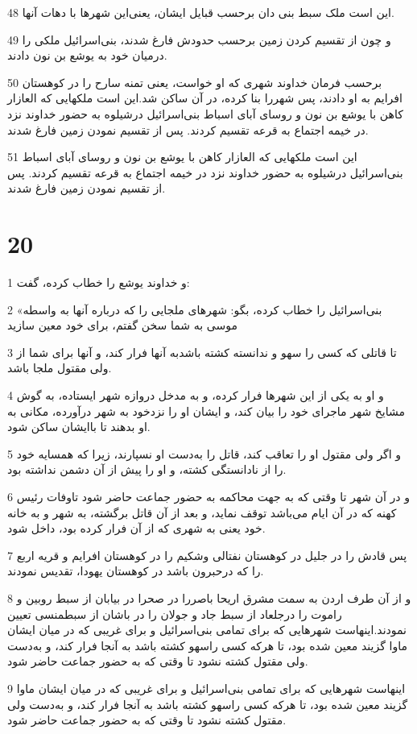 \par 48 این است ملک سبط بنی دان برحسب قبایل ایشان، یعنی‌این شهرها با دهات آنها.
\par 49 و چون از تقسیم کردن زمین برحسب حدودش فارغ شدند، بنی‌اسرائیل ملکی را درمیان خود به یوشع بن نون دادند.
\par 50 برحسب فرمان خداوند شهری که او خواست، یعنی تمنه سارح را در کوهستان افرایم به او دادند، پس شهررا بنا کرده، در آن ساکن شد.این است ملکهایی که العازار کاهن با یوشع بن نون و روسای آبای اسباط بنی‌اسرائیل درشیلوه به حضور خداوند نزد در خیمه اجتماع به قرعه تقسیم کردند. پس از تقسیم نمودن زمین فارغ شدند.
\par 51 این است ملکهایی که العازار کاهن با یوشع بن نون و روسای آبای اسباط بنی‌اسرائیل درشیلوه به حضور خداوند نزد در خیمه اجتماع به قرعه تقسیم کردند. پس از تقسیم نمودن زمین فارغ شدند.
 
\chapter{20}

\par 1 و خداوند یوشع را خطاب کرده، گفت:
\par 2 «بنی‌اسرائیل را خطاب کرده، بگو: شهرهای ملجایی را که درباره آنها به واسطه موسی به شما سخن گفتم، برای خود معین سازید
\par 3 تا قاتلی که کسی را سهو و ندانسته کشته باشدبه آنها فرار کند، و آنها برای شما از ولی مقتول ملجا باشد.
\par 4 و او به یکی از این شهرها فرار کرده، و به مدخل دروازه شهر ایستاده، به گوش مشایخ شهر ماجرای خود را بیان کند، و ایشان او را نزدخود به شهر درآورده، مکانی به او بدهند تا باایشان ساکن شود.
\par 5 و اگر ولی مقتول او را تعاقب کند، قاتل را به‌دست او نسپارند، زیرا که همسایه خود را از نادانستگی کشته، و او را پیش از آن دشمن نداشته بود.
\par 6 و در آن شهر تا وقتی که به جهت محاکمه به حضور جماعت حاضر شود تاوفات رئیس کهنه که در آن ایام می‌باشد توقف نماید، و بعد از آن قاتل برگشته، به شهر و به خانه خود یعنی به شهری که از آن فرار کرده بود، داخل شود.
\par 7 پس قادش را در جلیل در کوهستان نفتالی وشکیم را در کوهستان افرایم و قریه اربع را که درحبرون باشد در کوهستان یهودا، تقدیس نمودند.
\par 8 و از آن طرف اردن به سمت مشرق اریحا باصررا در صحرا در بیابان از سبط روبین و راموت را درجلعاد از سبط جاد و جولان را در باشان از سبطمنسی تعیین نمودند.اینهاست شهرهایی که برای تمامی بنی‌اسرائیل و برای غریبی که در میان ایشان ماوا گزیند معین شده بود، تا هر‌که کسی راسهو کشته باشد به آنجا فرار کند، و به‌دست ولی مقتول کشته نشود تا وقتی که به حضور جماعت حاضر شود.
\par 9 اینهاست شهرهایی که برای تمامی بنی‌اسرائیل و برای غریبی که در میان ایشان ماوا گزیند معین شده بود، تا هر‌که کسی راسهو کشته باشد به آنجا فرار کند، و به‌دست ولی مقتول کشته نشود تا وقتی که به حضور جماعت حاضر شود.
 
